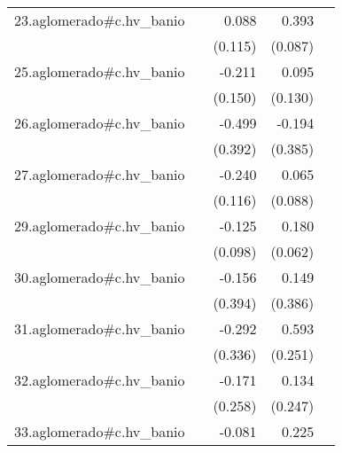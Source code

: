 {\begin{longtable}{l*{4}{D{.}{.}{-1}}}
\addlinespace
23.aglomerado#c.hv\_banio&                     &       0.088         &       0.393\sym{***}&                     \\
            &                     &     (0.115)         &     (0.087)         &                     \\
\addlinespace
25.aglomerado#c.hv\_banio&                     &      -0.211         &       0.095         &                     \\
            &                     &     (0.150)         &     (0.130)         &                     \\
\addlinespace
26.aglomerado#c.hv\_banio&                     &      -0.499         &      -0.194         &                     \\
            &                     &     (0.392)         &     (0.385)         &                     \\
\addlinespace
27.aglomerado#c.hv\_banio&                     &      -0.240\sym{*}  &       0.065         &                     \\
            &                     &     (0.116)         &     (0.088)         &                     \\
\addlinespace
29.aglomerado#c.hv\_banio&                     &      -0.125         &       0.180\sym{**} &                     \\
            &                     &     (0.098)         &     (0.062)         &                     \\
\addlinespace
30.aglomerado#c.hv\_banio&                     &      -0.156         &       0.149         &                     \\
            &                     &     (0.394)         &     (0.386)         &                     \\
\addlinespace
31.aglomerado#c.hv\_banio&                     &      -0.292         &       0.593\sym{*}  &                     \\
            &                     &     (0.336)         &     (0.251)         &                     \\
\addlinespace
32.aglomerado#c.hv\_banio&                     &      -0.171         &       0.134         &                     \\
            &                     &     (0.258)         &     (0.247)         &                     \\
\addlinespace
33.aglomerado#c.hv\_banio&                     &      -0.081         &       0.225\sym{***}&                     \\

\end{longtable}}
